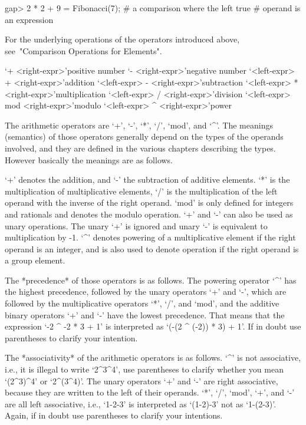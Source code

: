 {\beginexample
gap> 2 * 2 + 9 = Fibonacci(7);  # a comparison where the left
true                            # operand is an expression
\endexample

For the underlying operations of the operators introduced above,
see~"Comparison Operations for Elements".



\>`+ <right-expr>'{positive number}
\>`- <right-expr>'{negative number}
\>`<left-expr> + <right-expr>'{addition}
\>`<left-expr> - <right-expr>'{subtraction}
\>`<left-expr> * <right-expr>'{multiplication}
\>`<left-expr> / <right-expr>'{division}
\>`<left-expr> mod <right-expr>'{modulo}
\>`<left-expr> ^ <right-expr>'{power}

The arithmetic operators are `+', `-', `*', `/', `mod', and `^'.
The meanings (semantics) of those operators generally depend on the types
of the operands involved, and they are defined in the various chapters
describing the types. However basically the meanings are as follows.

`+' denotes the addition, and `-' the subtraction of additive elements.
`*' is the multiplication of multiplicative elements,
`/' is the multiplication of the left operand with the inverse of the
right operand.
`mod' is only defined for integers and rationals and denotes the modulo
operation.
`+' and `-' can also be used as unary operations.
The unary `+' is ignored and unary `-' is equivalent to multiplication by -1.
`^' denotes powering of a multiplicative element if the right operand
is an integer,
and is also used to denote operation if the right operand is a group
element.

The *precedence* of those operators is as follows. The powering operator
`^' has the highest precedence, followed by the unary operators `+' and
`-', which are followed by the multiplicative operators `*', `/', and
`mod', and the additive binary operators `+' and `-' have the lowest
precedence.  That means that the expression `-2 ^ -2 * 3 + 1' is
interpreted as `(-(2 ^ (-2)) * 3) + 1'. If in doubt use parentheses
to clarify your intention.

The *associativity* of the arithmetic operators is as follows.
`^' is not associative, i.e., it is illegal to write `2^3^4',
use parentheses to clarify whether you mean `(2^3)^4' or `2^(3^4)'.
The unary operators `+' and `-' are right associative,
because they are written to the left of their operands.
`*', `/', `mod', `+', and `-' are all left associative,
i.e., `1-2-3' is interpreted as `(1-2)-3' not as `1-(2-3)'.
Again, if in doubt use parentheses to clarify your intentions.

}
